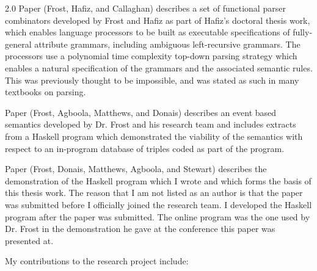 \documentclass[fleqn, oneside, 12pt]{book}
\theoremstyle{definitionsty}
\newcommand{\uwindoublespacelen}{2.0}
\newcommand{\uwindefaultspacelen}{\uwindoublespacelen}
\newenvironment{uwindefaultspaceenv}%
{\begin{spacing}{\uwindefaultspacelen}}%
	{\end{spacing}}
\begin{document}
\cite{frosthafiz2008} 

\cite{frostagboola2014} 

\cite{frost2014demonstration} 

\begin{uwindefaultspaceenv}
	Paper \cite{frosthafiz2008} (Frost, Hafiz, and Callaghan) describes a set of functional parser combinators developed by Frost and Hafiz as part of Hafiz's doctoral thesis work, which enables language processors to be built as executable specifications of fully-general attribute grammars, including ambiguous left-recursive grammars.  The processors use a polynomial time complexity top-down parsing strategy which enables a natural specification of the grammars and the associated semantic rules.  This was previously thought to be impossible, and was stated as such in many textbooks on parsing.
	
	Paper \cite{frostagboola2014} (Frost, Agboola, Matthews, and Donais) describes an event based semantics developed by Dr. Frost and his research team and includes extracts from a Haskell program which demonstrated the viability of the semantics with respect to an in-program database of triples coded as part of the program.
	
	Paper \cite{frost2014demonstration} (Frost, Donais, Matthews, Agboola, and Stewart) describes the demonstration of the Haskell program which I wrote and which forms the basis of this thesis work.  The reason that I am not listed as an author is that the paper was submitted before I officially joined the research team.  I developed the Haskell program after the paper was submitted.  The online program was the one used by Dr. Frost in the demonstration he gave at the conference this paper was presented at.
	
	My contributions to the research project include:
	

\end{uwindefaultspaceenv}
\end{document}
